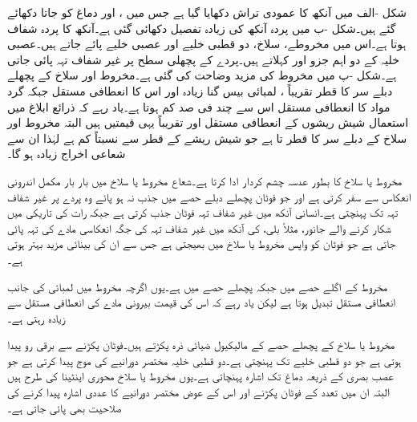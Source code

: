 شکل -الف میں آنکھ کا عمودی تراش دکھایا گیا ہے جس میں ،  اور دماغ کو جاتا  دکھائے گئے ہیں۔شکل -ب میں پردہ آنکھ کی زیادہ تفصیل دکھائی گئی ہے۔آنکھ کا پردہ شفاف ہوتا ہے۔اس میں مخروطے، سلاخ، دو قطبی خلیے اور  عصبی خلیے پائے جاتے ہیں۔عصبی خلیہ کے دو اہم جزو  اور  کہلاتے ہیں۔پردے کے پچھلی سطح پر غیر شفاف تہہ پائی جاتی ہے۔شکل -پ میں مخروط کی مزید وضاحت  کی گئی ہے۔مخروط اور سلاخ کے  پچھلے دبلے سر کا قطر تقریباً ، لمبائی بیس گنا زیادہ اور اس کا  انعطافی مستقل  جبکہ گرد مواد کا  انعطافی مستقل  اس سے چند فی صد کم ہوتا ہے۔یاد رہے کہ ذرائع ابلاغ میں استعمال شیش ریشوں کے  انعطافی مستقل  اور  تقریباً یہی قیمتیں ہیں البتہ مخروط اور سلاخ کے دبلے سر کا قطر  تا  ہے جو شیش ریشے کے قطر سے نسبتاً کم ہے لہٰذا ان سے شعاعی اخراج زیادہ ہو گا۔

مخروط یا سلاخ کا  بطور عدسہ چشم کردار ادا کرتا ہے۔شعاع مخروط یا سلاخ میں بار بار مکمل اندرونی انعکاس سے سفر کرتی ہے اور جو فوٹان پچھلے دبلے حصے میں جذب نہ ہو پائے وہ پردے پر غیر شفاف تہہ تک پہنچتی ہے۔انسانی آنکھ میں غیر شفاف تہہ فوٹان جذب کرتی ہے جبکہ رات کی تاریکی میں شکار کرنے والے جانور، مثلاً بلی،  کی آنکھ میں غیر شفاف تہہ کی جگہ انعکاسی مادے کی تہہ پائی جاتی ہے جو فوٹان کو واپس مخروط یا سلاخ میں بھیجتی ہے جس سے ان کی بینائی مزید بہتر ہوتی ہے۔ 

مخروط کے اگلے حصے میں  جبکہ پچھلے حصے میں  ہے۔یوں اگرچہ مخروط میں لمبائی کی جانب  انعطافی مستقل تبدیل ہوتا ہے لیکن یاد رہے کہ اس کی قیمت بیرونی مادے کی  انعطافی مستقل سے زیادہ رہتی ہے۔

مخروط یا سلاخ کے پچھلے حصے کے مالیکیول ضیائی ذرہ پکڑتے ہیں۔فوٹان پکڑنے سے برقی رو پیدا ہوتی ہے جو دو قطبی خلیے تک پہنچتی ہے۔دو قطبی خلیہ مختصر دورانیے کی موج پیدا کرتی ہے جو عصب بصری کے ذریعہ دماغ تک اشارہ پہنچاتی ہے۔یوں مخروط یا سلاخ محوری اینٹینا کی طرح ہیں البتہ ان میں  تعدد کے فوٹان پکڑنے اور اس کے عوض مختصر دورانیے کا عددی اشارہ پیدا کرنے کی صلاحیت بھی پائی جاتی ہے۔  

